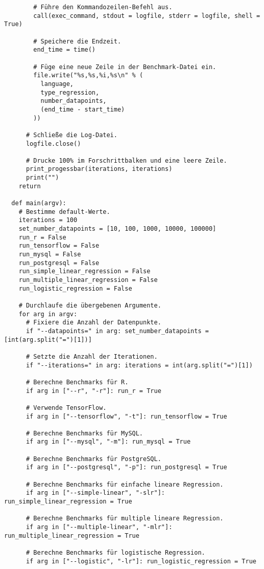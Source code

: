 \begin{verbatim}
        # Führe den Kommandozeilen-Befehl aus.
        call(exec_command, stdout = logfile, stderr = logfile, shell = True)

        # Speichere die Endzeit.
        end_time = time()

        # Füge eine neue Zeile in der Benchmark-Datei ein.
        file.write("%s,%s,%i,%s\n" % (
          language,
          type_regression,
          number_datapoints,
          (end_time - start_time)
        ))

      # Schließe die Log-Datei.
      logfile.close()

      # Drucke 100% im Forschrittbalken und eine leere Zeile.
      print_progessbar(iterations, iterations)
      print("")
    return

  def main(argv):
    # Bestimme default-Werte.
    iterations = 100
    set_number_datapoints = [10, 100, 1000, 10000, 100000]
    run_r = False
    run_tensorflow = False
    run_mysql = False
    run_postgresql = False
    run_simple_linear_regression = False
    run_multiple_linear_regression = False
    run_logistic_regression = False

    # Durchlaufe die übergebenen Argumente.
    for arg in argv:
      # Fixiere die Anzahl der Datenpunkte.
      if "--datapoints=" in arg: set_number_datapoints = [int(arg.split("=")[1])]

      # Setzte die Anzahl der Iterationen.
      if "--iterations=" in arg: iterations = int(arg.split("=")[1])

      # Berechne Benchmarks für R.
      if arg in ["--r", "-r"]: run_r = True

      # Verwende TensorFlow.
      if arg in ["--tensorflow", "-t"]: run_tensorflow = True

      # Berechne Benchmarks für MySQL.
      if arg in ["--mysql", "-m"]: run_mysql = True

      # Berechne Benchmarks für PostgreSQL.
      if arg in ["--postgresql", "-p"]: run_postgresql = True

      # Berechne Benchmarks für einfache lineare Regression.
      if arg in ["--simple-linear", "-slr"]: run_simple_linear_regression = True

      # Berechne Benchmarks für multiple lineare Regression.
      if arg in ["--multiple-linear", "-mlr"]: run_multiple_linear_regression = True

      # Berechne Benchmarks für logistische Regression.
      if arg in ["--logistic", "-lr"]: run_logistic_regression = True


\end{verbatim}
